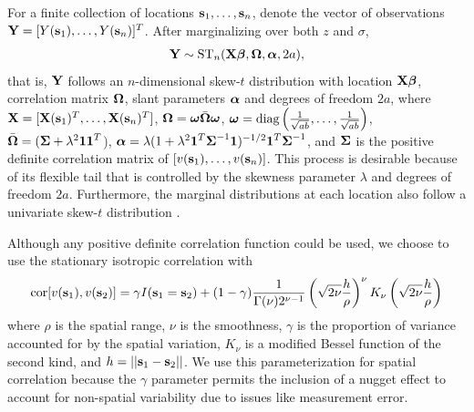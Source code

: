 \documentclass[11pt]{article}
\begin{document}
For a finite collection of locations $\mbox{\bf s}_1, \ldots, \mbox{\bf s}_n$, denote the vector of observations $\mbox{\bf Y} = [Y(\mbox{\bf s}_1), \ldots, Y(\mbox{\bf s}_n)]^T$.
After marginalizing over both $z$ and $\sigma$,
\begin{align}
  \mbox{\bf Y} \sim \text{ST}_n(\mbox{\bf X} \mbox{\boldmath $\beta$}, \mbox{\boldmath $\Omega$}, \mbox{\boldmath $\alpha$}, 2a), \label{eq:fullmodel}
\end{align}
that is, $\mbox{\bf Y}$ follows an $n$-dimensional skew-$t$ distribution with location $\mbox{\bf X} \mbox{\boldmath $\beta$}$, correlation matrix $\mbox{\boldmath $\Omega$}$, slant parameters $\mbox{\boldmath $\alpha$}$ and degrees of freedom $2a$, where $\mbox{\bf X} = [\mbox{\bf X}(\mbox{\bf s}_1)^T, \ldots, \mbox{\bf X}(\mbox{\bf s}_n)^T]$, $\mbox{\boldmath $\Omega$} = \mbox{\boldmath $\omega$} \bar{\mbox{\boldmath $\Omega$}} \mbox{\boldmath $\omega$}$, $\mbox{\boldmath $\omega$} = \text{diag}\left(\frac{1}{ \sqrt{ab}}, \ldots, \frac{1}{\sqrt{ab}}\right)$, $\bar{\mbox{\boldmath $\Omega$}} = (\mbox{\boldmath $\Sigma$} + \lambda^2 \mbox{\boldmath $1$} \mbox{\boldmath $1$}^T$), $\mbox{\boldmath $\alpha$} = \lambda (1 + \lambda^2 \mbox{\boldmath $1$}^T \mbox{\boldmath $\Sigma$}^{-1} \mbox{\boldmath $1$})^{-1/2} \mbox{\boldmath $1$}^T \mbox{\boldmath $\Sigma$}^{-1}$, and $\mbox{\boldmath $\Sigma$}$ is the positive definite correlation matrix of $[v(\mbox{\bf s}_1), \ldots, v(\mbox{\bf s}_n)]$.
This process is desirable because of its flexible tail that is controlled by the skewness parameter $\lambda$ and degrees of freedom $2a$.
Furthermore, the marginal distributions at each location also follow a univariate skew-$t$ distribution \citep{Azzalini2014}.

Although any positive definite correlation function could be used, we choose to use the stationary isotropic \Matern correlation with
\begin{align}
  \text{cor}[v(\mbox{\bf s}_1), v(\mbox{\bf s}_2)] = \gamma I(\mbox{\bf s}_1 = \mbox{\bf s}_2) + (1 - \gamma)  \frac{ 1 }{ \Gamma(\nu) 2^{ \nu - 1}} \left( \sqrt{2\nu} \frac{ h }{ \rho } \right)^{\nu} K_{\nu} \left( \sqrt{2\nu} \frac{ h }{ \rho } \right) \label{eq:matern}
\end{align}
where $\rho$ is the spatial range, $\nu$ is the smoothness, $\gamma$ is the proportion of variance accounted for by the spatial variation, $K_\nu$ is a modified Bessel function of the second kind, and $h = || \mbox{\bf s}_1 - \mbox{\bf s}_2 ||$.
We use this parameterization for spatial correlation because the $\gamma$ parameter permits the inclusion of a nugget effect to account for non-spatial variability due to issues like measurement error.
\end{document}
